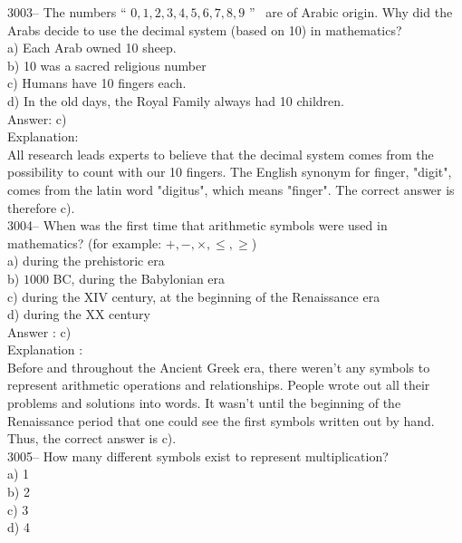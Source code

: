 \documentclass[letterpaper, 12pt]{article}
\begin{document}
3003-- The numbers `` $0, 1, 2, 3, 4, 5, 6, 7, 8, 9$ '' \ are of Arabic origin. Why did the Arabs decide to use the decimal system (based on 10) in mathematics?\\

a) Each Arab owned 10 sheep.\\
b) 10 was a sacred religious number\\
c) Humans have 10 fingers each.\\
d) In the old days, the Royal Family always had 10 children.\\

Answer: c)\\

Explanation:\\
All research leads experts to believe that the decimal system comes from the possibility to count with our 10 fingers. The English synonym for finger, "digit", comes from the latin word "digitus", which means "finger". The correct answer is therefore c).\\



3004-- When was the first time that arithmetic symbols were used in mathematics? (for example: $+, -, \times , \leq , \geq $)\\

a) during the prehistoric era\\
b) $1000$ BC, during the Babylonian era\\
c) during the XIV century, at the beginning of the Renaissance era\\
d) during the XX century\\

Answer : c)\\

Explanation :\\
Before and throughout the Ancient Greek era, there weren't any symbols to represent arithmetic operations and relationships. People wrote out all their problems and solutions into words. It wasn't until the beginning of the Renaissance period that one could see the first symbols written out by hand. Thus, the correct answer is c).\\



3005-- How many different symbols exist to represent multiplication?\\

a) 1\\
b) 2\\
c) 3\\
d) 4\\
\end{document}
